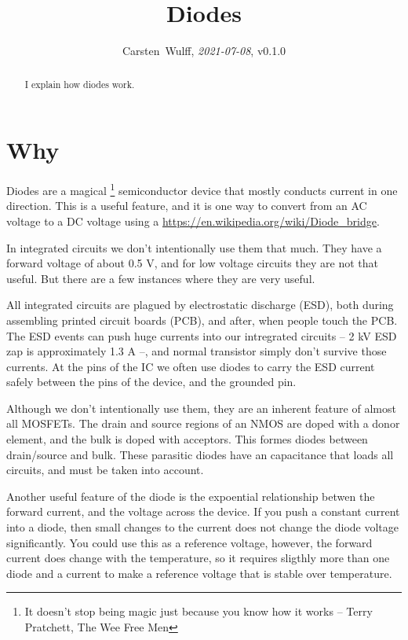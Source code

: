 \documentclass[technote,10pt,a4paper]{IEEEtran}
\begin{document}

\title{Diodes}
\author{Carsten~Wulff, \textit{2021-07-08}, v0.1.0 }
\maketitle

\begin{abstract}
I explain how diodes work.
\end{abstract}

\section{Why}
Diodes are a magical \footnote{It doesn't stop being magic just because you know
  how it works -- Terry Pratchett, The Wee Free Men} semiconductor device that mostly conducts current in one
direction. This is a useful feature, and it is one way to convert from an AC
voltage to a DC voltage using a
\url{https://en.wikipedia.org/wiki/Diode_bridge}.

In integrated circuits we don't intentionally use them that much. They have a forward voltage
of about 0.5 V, and for low voltage circuits they are not that useful. But there
are a few instances where they are very useful.

All integrated circuits are plagued by electrostatic discharge (ESD), both during
assembling printed circuit boards (PCB), and after, when people touch the PCB.
The ESD events can push huge currents into our intregrated circuits -- 2 kV ESD
zap is approximately 1.3 A --, and normal transistor simply don't survive those
currents. At the pins of the IC we often use diodes to carry the ESD current
safely between the pins of the device, and the grounded pin.

Although we don't intentionally use them, they are an inherent feature of almost
all MOSFETs. The drain and source regions of an NMOS are doped with a donor element, and
the bulk is doped with acceptors. This formes diodes between drain/source and
bulk. These parasitic diodes have an capacitance that loads all circuits, and
must be taken into account.

Another useful feature of the diode is the expoential relationship betwen the
forward current, and the voltage across the device. If you push a constant
current into a diode, then small changes to the current does not change the
diode voltage significantly. You could use this as a reference voltage, however,
the forward current does change with the temperature, so it requires sligthly
more than one diode and a current to make a reference voltage that is stable over temperature.
\end{document}
